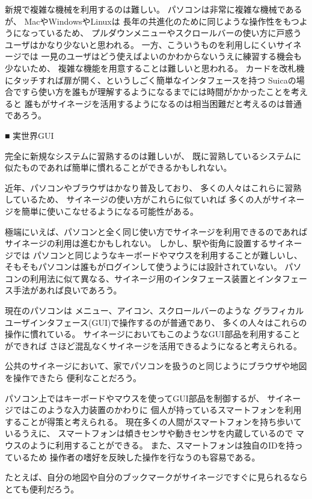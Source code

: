 新規で複雑な機械を利用するのは難しい。
パソコンは非常に複雑な機械であるが、
MacやWindowsやLinuxは
長年の共進化のために同じような操作性をもつようになっているため、
プルダウンメニューやスクロールバーの使い方に戸惑うユーザはかなり少ないと思われる。
一方、こういうものを利用しにくいサイネージでは
一見のユーザはどう使えばよいのかわからないうえに練習する機会も少ないため、
複雑な機能を用意することは難しいと思われる。
カードを改札機にタッチすれば扉が開く、というしごく簡単なインタフェースを持つ
Suicaの場合ですら使い方を誰もが理解するようになるまでには時間がかかったことを考えると
誰もがサイネージを活用するようになるのは相当困難だと考えるのは普通であろう。

■ 実世界GUI

完全に新規なシステムに習熟するのは難しいが、
既に習熟しているシステムに似たものであれば簡単に慣れることができるかもしれない。

近年、パソコンやブラウザはかなり普及しており、
多くの人々はこれらに習熟しているため、
サイネージの使い方がこれらに似ていれば
多くの人がサイネージを簡単に使いこなせるようになる可能性がある。

極端にいえば、パソコンと全く同じ使い方でサイネージを利用できるのであれば
サイネージの利用は進むかもしれない。
しかし、駅や街角に設置するサイネージでは
パソコンと同じようなキーボードやマウスを利用することが難しいし、
そもそもパソコンは誰もがログインして使うようには設計されていない。
パソコンの利用法に似て異なる、サイネージ用のインタフェース装置とインタフェース手法があれば良いであろう。

現在のパソコンは
メニュー、アイコン、スクロールバーのような
グラフィカルユーザインタフェース(GUI)で操作するのが普通であり、
多くの人々はこれらの操作に慣れている。
サイネージにおいてもこのようなGUI部品を利用することができれば
さほど混乱なくサイネージを活用できるようになると考えられる。

公共のサイネージにおいて、家でパソコンを扱うのと同じようにブラウザや地図を操作できたら
便利なことだろう。

パソコン上ではキーボードやマウスを使ってGUI部品を制御するが、
サイネージではこのような入力装置のかわりに
個人が持っているスマートフォンを利用することが得策と考えられる。
現在多くの人間がスマートフォンを持ち歩いているうえに、
スマートフォンは傾きセンサや動きセンサを内蔵しているので
マウスのように利用することができる。
また、スマートフォンは独自のIDを持っているため
操作者の嗜好を反映した操作を行なうのも容易である。

たとえば、自分の地図や自分のブックマークがサイネージですぐに見られるならとても便利だろう。

